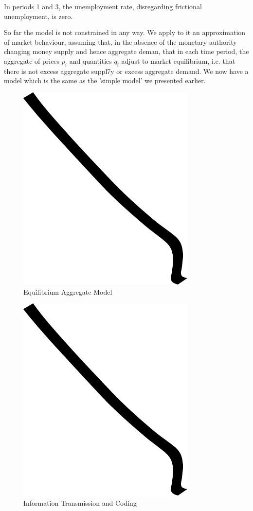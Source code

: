 In periods 1 and 3, the unemployment rate, disregarding frictional unemployment, is zero.

So far the model is not constrained in any way. We apply to it an approximation of market behaviour,
assuming that, in the absence of the monetary authority changing money supply and hence aggregate
deman, that in each time period, the aggregate of prices \(p_i\) and quantities \(q_i\) adjust to
market equilibrium, i.e. that there is not excess aggregate suppl7y or excess aggregate demand. We
now have a model which is the same as the 'simple model' we presented earlier.

\begin{figure}
\centering
\includegraphics{img/example.pdf}
\caption{Equilibrium Aggregate Model}
\end{figure}

\begin{figure}
\centering
\includegraphics{img/example.pdf}
\caption{Information Transmission and Coding}
\end{figure}

